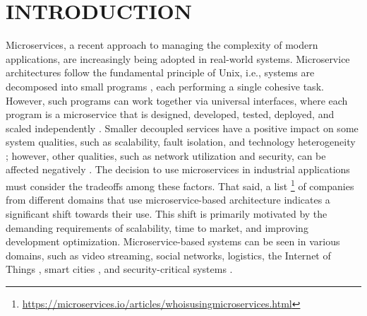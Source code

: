 \section{INTRODUCTION}

Microservices, a recent approach to managing the complexity of modern applications, are increasingly being adopted in real-world systems. Microservice architectures follow the fundamental principle of Unix, i.e., systems are decomposed into small programs \cite{wolff2016microservices}, each performing a single cohesive task. However, such programs can work together via universal interfaces, where each program is a microservice that is designed, developed, tested,  deployed, and scaled independently \cite{microservicesfrowler}. Smaller decoupled services have a positive impact on some system qualities, such as scalability, fault isolation, and technology heterogeneity \cite{newman2015building}; however, other qualities, such as network utilization and security, can be affected negatively \cite{ahmadvand2016requirements}. The decision to use microservices in industrial applications must consider the tradeoffs among these factors. That said, a list \footnote{\url{https://microservices.io/articles/whoisusingmicroservices.html}} of companies from different domains that use microservice-based architecture indicates a significant shift towards their use. This shift is primarily motivated by the demanding requirements of scalability, time to market, and improving development optimization. Microservice-based systems can be seen in various domains, such as video streaming, social networks, logistics, the Internet of Things \cite{butzin2016microservices}, smart cities \cite{krylovskiy2015designing}, and security-critical systems \cite{fetzer2016building}. 

